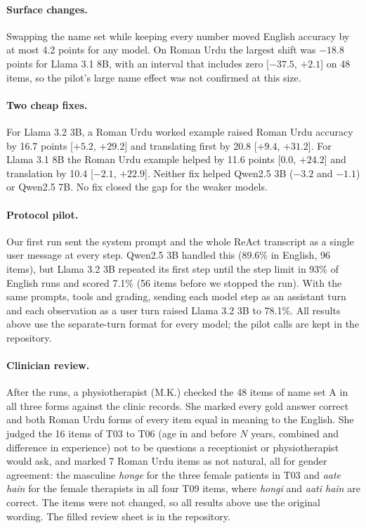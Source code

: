 \documentclass[11pt]{article}
\begin{document}
\paragraph{Surface changes.} Swapping the name set while keeping every number moved English accuracy by at most 4.2 points for any model. On Roman Urdu the largest shift was $-18.8$ points for Llama 3.1 8B, with an interval that includes zero [$-37.5$, $+2.1$] on 48 items, so the pilot's large name effect was not confirmed at this size.

\paragraph{Two cheap fixes.} For Llama 3.2 3B, a Roman Urdu worked example raised Roman Urdu accuracy by 16.7 points [$+5.2$, $+29.2$] and translating first by 20.8 [$+9.4$, $+31.2$]. For Llama 3.1 8B the Roman Urdu example helped by 11.6 points [$0.0$, $+24.2$] and translation by 10.4 [$-2.1$, $+22.9$]. Neither fix helped Qwen2.5 3B ($-3.2$ and $-1.1$) or Qwen2.5 7B. No fix closed the gap for the weaker models.

\paragraph{Protocol pilot.} Our first run sent the system prompt and the whole ReAct transcript as a single user message at every step. Qwen2.5 3B handled this (89.6\% in English, 96 items), but Llama 3.2 3B repeated its first step until the step limit in 93\% of English runs and scored 7.1\% (56 items before we stopped the run). With the same prompts, tools and grading, sending each model step as an assistant turn and each observation as a user turn raised Llama 3.2 3B to 78.1\%. All results above use the separate-turn format for every model; the pilot calls are kept in the repository.

\paragraph{Clinician review.} After the runs, a physiotherapist (M.K.) checked the 48 items of name set A in all three forms against the clinic records. She marked every gold answer correct and both Roman Urdu forms of every item equal in meaning to the English. She judged the 16 items of T03 to T06 (age in and before $N$ years, combined and difference in experience) not to be questions a receptionist or physiotherapist would ask, and marked 7 Roman Urdu items as not natural, all for gender agreement: the masculine \emph{honge} for the three female patients in T03 and \emph{aate hain} for the female therapists in all four T09 items, where \emph{hongi} and \emph{aati hain} are correct. The items were not changed, so all results above use the original wording. The filled review sheet is in the repository.
\end{document}
